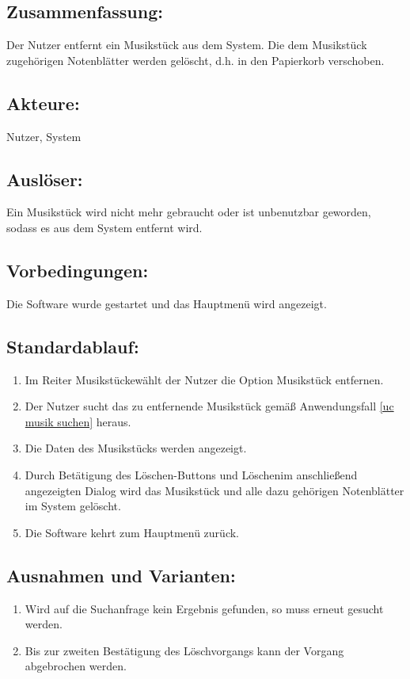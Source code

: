 \documentclass[a4paper,10pt]{scrartcl}
\begin{document}
\subsection{Zusammenfassung:}
Der Nutzer entfernt ein Musikstück aus dem System. Die dem Musikstück zugehörigen Notenblätter werden gelöscht, d.h. in den Papierkorb verschoben.
\subsection{Akteure:}
Nutzer, System
\subsection{Auslöser:}
Ein Musikstück wird nicht mehr gebraucht oder ist unbenutzbar geworden, sodass es aus dem System entfernt wird.
\subsection{Vorbedingungen:}
Die Software wurde gestartet und das Hauptmenü wird angezeigt.
\subsection{Standardablauf:}
\begin{enumerate}
	\item Im Reiter \glqq Musikstücke\grqq wählt der Nutzer die Option \glqq Musikstück entfernen\grqq.
	\item Der Nutzer sucht das zu entfernende Musikstück gemäß Anwendungsfall \ref{uc musik suchen} heraus.
	\item Die Daten des Musikstücks werden angezeigt.
	\item Durch Betätigung des \glqq Löschen\grqq  -Buttons und \glqq Löschen\grqq im anschließend angezeigten Dialog wird das Musikstück und alle dazu gehörigen Notenblätter im System gelöscht.
	\item Die Software kehrt zum Hauptmenü zurück.
\end{enumerate}
\subsection{Ausnahmen und Varianten:}
\begin{enumerate}
	\item Wird auf die Suchanfrage kein Ergebnis gefunden, so muss erneut gesucht werden.
	\item Bis zur zweiten Bestätigung des Löschvorgangs kann der Vorgang abgebrochen werden.
\end{enumerate}
\end{document}
